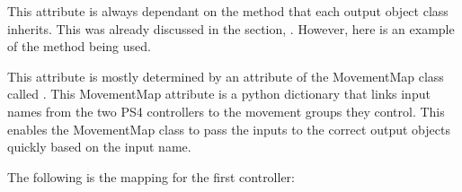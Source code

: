 \documentclass[letterpaper,10pt,english]{sphinxmanual}
\begin{document}
\sphinxAtStartPar
{}

\sphinxAtStartPar
This attribute is always dependant on the  method that each
output object class inherits. This was already discussed in the section,
{\hyperref[\detokenize{range:pyrange}]{}}. However, here is an example of the method being used.

\begin{sphinxVerbatim}[commandchars=\\\{\}]
\PYG{p}{[} \PYG{p}{]} \PYG{p}{[} \PYG{p}{]} \PYG{p}{[} \PYG{p}{]}
\end{sphinxVerbatim}

\sphinxAtStartPar
{}

\sphinxAtStartPar
This attribute is mostly determined by an attribute of the MovementMap
class called . This MovementMap attribute is a python
dictionary that links input names from the two PS4 controllers to the
movement groups they control. This enables the MovementMap class to pass
the inputs to the correct output objects quickly based on the input name.

\sphinxAtStartPar
The following is the mapping for the first controller:
\end{document}
